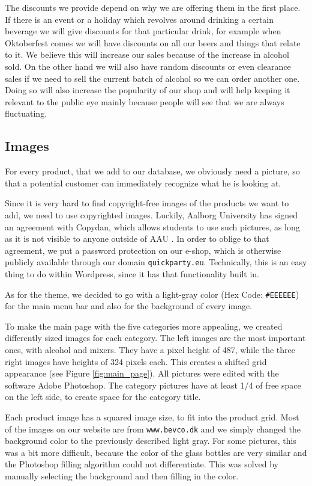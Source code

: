 \documentclass[12p]{article}
\begin{document}
The discounts we provide depend on why we are offering them in the first place. If there is an event or a holiday which revolves around drinking a certain beverage we will give discounts for that particular drink, for example when Oktoberfest\cite{Oktoberfest} comes we will have discounts on all our beers and things that relate to it. We believe this will increase our sales because of the increase in alcohol sold. On the other hand we will also have random discounts or even clearance sales if we need to sell the current batch of alcohol so we can order another one. Doing so will also increase the popularity of our shop and will help keeping it relevant to the public eye mainly because people will see that we are always fluctuating. 


\subsection{Images}

For every product, that we add to our database, we obviously need a picture, so that a potential customer can immediately recognize what he is looking at. 

Since it is very hard to find copyright-free images of the products we want to add, we need to use copyrighted images. Luckily, Aalborg University has signed an agreement with Copydan, which allows students to use such pictures, as long as it is not visible to anyone outside of AAU \cite{AAUCopyrightAgreement}. In order to oblige to that agreement, we put a password protection on our e-shop, which is otherwise publicly available through our domain \texttt{quickparty.eu}. Technically, this is an easy thing to do within Wordpress, since it has that functionality built in.

As for the theme, we decided to go with a light-gray color (Hex Code: \texttt{\#EEEEEE}) for the main menu bar and also for the background of every image. 

To make the main page with the five categories more appealing, we created differently sized images for each category. The left images are the most important ones, with alcohol and mixers. They have a pixel height of 487, while the three right images have heights of 324 pixels each. This creates a shifted grid appearance (see Figure \ref{fig:main_page}). All pictures were edited with the software Adobe Photoshop. The category pictures have at least 1/4 of free space on the left side, to create space for the category title.

Each product image has a squared image size, to fit into the product grid. Most of the images on our website are from \texttt{www.bevco.dk} and we simply changed the background color to the previously described light gray. For some pictures, this was a bit more difficult, because the color of the glass bottles are very similar and the Photoshop filling algorithm could  not differentiate. This was solved by manually selecting the background and then filling in the color.
\end{document}
